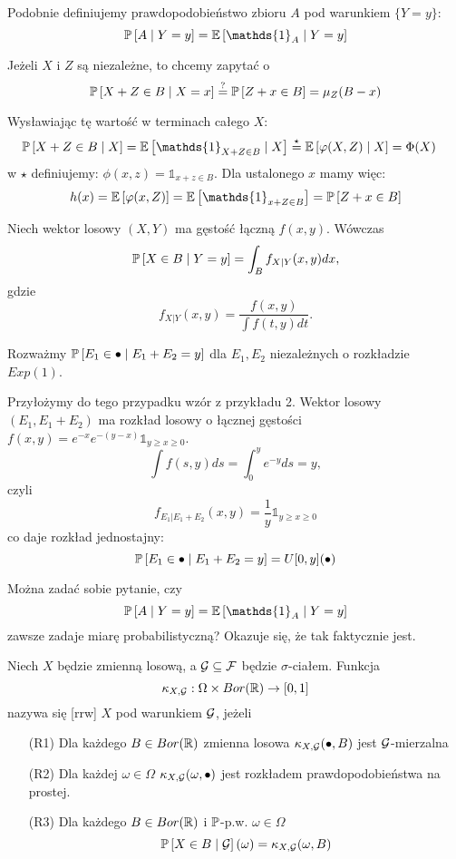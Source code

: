 Podobnie definiujemy prawdopodobieństwo zbioru $A$ pod warunkiem $\{Y=y\}$:
$$\prob{A}{Y=y}=\expected{\mathds{1}_A}{Y=y}$$

\begin{example}
\item Jeżeli $X$ i $Z$ są niezależne, to chcemy zapytać o
  $$\prob{X+Z\in B}{X=x}\overset{?}{=}\prob{Z+x\in B}=\mu_Z(B-x)$$

  Wysławiając tę wartość w terminach całego $X$:
  \begin{align*}
    \prob{X+Z\in B}{X}&=\expected{\mathds{1}_{X+Z\in B}}{X}\overset{\star}{=}\expected{\phi(X, Z)}{X}=\Phi(X)
  \end{align*}
  w $\star$ definiujemy: $\phi(x,z)=\mathds{1}_{x+z\in B}$. Dla ustalonego $x$ mamy więc:
  $$h(x)=\expected{\phi(x, Z)}=\expected{\mathds{1}_{x+Z\in B}}=\prob{Z+x\in B}$$
\item Niech wektor losowy $(X, Y)$ ma gęstość łączną $f(x,y)$. Wówczas
  $$\prob{X\in B}{Y=y}=\int_Bf_{X|Y}(x,y)dx,$$
  gdzie 
  $$f_{X|Y}(x,y)=\frac{f(x,y)}{\int f(t,y)dt}.$$
\item Rozważmy $\prob{E_1\in\bullet}{E_1+E_2=y}$ dla $E_1,E_2$ niezależnych o rozkładzie $Exp(1)$.

  Przyłożymy do tego przypadku wzór z przykładu 2. Wektor losowy $(E_1, E_1+E_2)$ ma rozkład losowy o łącznej gęstości $f(x, y)=e^{-x}e^{-(y-x)}\mathds{1}_{y\geq x\geq0}$. 
  $$\int f(s, y)ds=\int_0^ye^{-y}ds=y,$$
  czyli 
  $$f_{E_1|E_1+E_2}(x, y)=\frac{1}{y}\mathds{1}_{y\geq x\geq 0}$$
  co daje rozkład jednostajny:
  $$\prob{E_1\in\bullet}{E_1+E_2=y}=U[0, y](\bullet)$$
\end{example}
\bigskip

Można zadać sobie pytanie, czy
$$\prob{A}{Y=y}=\expected{\mathds{1}_A}{Y=y}$$
zawsze zadaje miarę probabilistyczną? Okazuje się, że tak faktycznie jest.

\begin{definition}
  Niech $X$ będzie zmienną losową, a $\mathcal{G}\subseteq\mathcal{F}$ będzie $\sigma$-ciałem. Funkcja 
  $$\kappa_{X,\mathcal{G}}:\Omega\times Bor(\operatorname{\mathbb{R}})\to [0,1]$$
  nazywa się  [rrw] $X$ pod warunkiem $\mathcal{G}$, jeżeli
  \begin{itemize}
    \item[(R1)] Dla każdego $B\in Bor(\operatorname{\mathbb{R}})$ zmienna losowa $\kappa_{X,\mathcal{G}}(\bullet, B)$ jest $\mathcal{G}$-mierzalna
    \item[(R2)] Dla każdej $\omega\in\Omega$ $\kappa_{X,\mathcal{G}}(\omega,\bullet)$ jest rozkładem prawdopodobieństwa na prostej.
    \item[(R3)] Dla każdego $B\in Bor(\operatorname{\mathbb{R}})$ i $\prob$-p.w. $\omega\in\Omega$
      $$\prob{X\in B}{\set{G}}(\omega)=\kappa_{X,\set{G}}(\omega, B)$$
  \end{itemize}
\end{definition}


